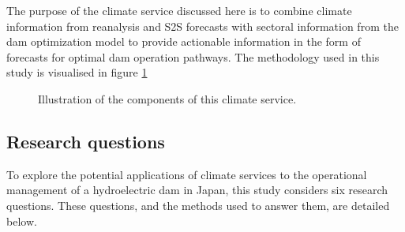 \documentclass[11pt]{article}
\begin{document}
The purpose of the climate service discussed here is to combine climate information from reanalysis and S2S forecasts with sectoral information from the dam optimization model to provide actionable information in the form of forecasts for optimal dam operation pathways. The methodology used in this study is visualised in figure \ref{fig:climate_service}

\begin{figure}
    \centering
    \caption{Illustration of the components of this climate service.}
    \label{fig:climate_service}
\end{figure}

\subsection*{Research questions}

To explore the potential applications of climate services to the operational management of a hydroelectric dam in Japan, this study considers six research questions. These questions, and the methods used to answer them, are detailed below.
\end{document}

